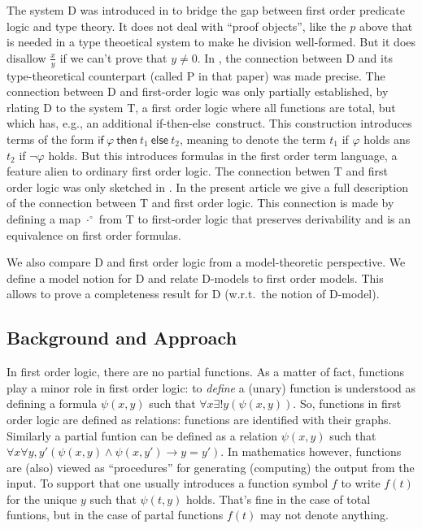 \documentclass{article}
\newcommand{\D}{\textsf D}
\newcommand{\PP}{\textsf P}
\newcommand{\T}{\textsf T}
\newcommand{\ifte}{\textsf{if-then-else}}
\newcommand{\ifthelse}[3]{\ensuremath{\mathsf{if}\ {#1}\ \mathsf{then}\ {#2}\ \mathsf{else}\ {#3}}}
\newcommand{\ofun}[1]{\ensuremath{{#1}^\circ}}
\newcommand{\omap}{\ofun\cdot}
\begin{document}
The system {\D} was introduced in \cite{wie:zwa:03} to bridge the gap
between first order predicate logic and type theory. It does not deal
with ``proof objects'', like the $p$ above that is needed in a type
theoetical system to make he division well-formed. But it does
disallow $\frac{x}{y}$ if we can't prove that $y\neq 0$. In \cite
{wie:zwa:03}, the connection between {\D} and its type-theoretical
counterpart (called {\PP} in that paper) was made precise. The
connection between {\D} and first-order logic was only partially
established, by rlating {\D} to the system {\T}, a first order logic
where all functions are total, but which has, e.g., an additional
\ifte\ construct. This construction introduces terms of the form 
$\ifthelse{\varphi}{t_1}{t_2}$, meaning to denote the term $t_1$ if
$\varphi$ holds ans $t_2$ if $\neg\varphi$ holds. But this introduces
formulas in the first order term language, a feature alien to ordinary
first order logic.  The connection betwen {\T} and first order logic
was only sketched in
\cite{wie:zwa:03}. In the present article we give a full description
of the connection between {\T} and first order logic. This connection
is made by defining a map $\omap$ from {\T} to first-order logic that
preserves derivability and is an equivalence on first order formulas.

We also compare {\D} and first order logic from a model-theoretic
perspective. We define a model notion for {\D} and relate {\D}-models to
first order models. This allows to prove a completeness result for {\D}
(w.r.t.\ the notion of {\D}-model). 

\subsection{Background and Approach}
In first order logic, there are no partial functions. As a matter of
fact, functions play a minor role in first order logic: to {\em
define\/} a (unary) function is understood as defining a formula
$\psi(x,y)$ such that $\forall x \exists ! y( \psi(x,y))$. So,
functions in first order logic are defined as relations: functions are
identified with their graphs. Similarly a partial funtion can be
defined as a relation $\psi(x,y)$ such that $\forall x \forall y, y'(
\psi(x,y)\wedge \psi(x,y') \rightarrow y = y')$. In mathematics
however, functions are (also) viewed as ``procedures'' for generating
(computing) the output from the input. To support that one usually
introduces a function symbol $f$ to write $f(t)$ for the unique $y$
such that $\psi(t,y)$ holds. That's fine in the case of total
funtions, but in the case of partal functions $f(t)$ may not denote
anything.
\end{document}
